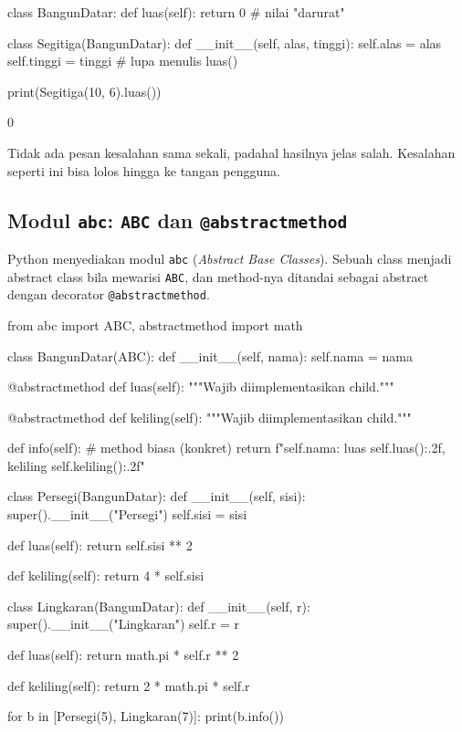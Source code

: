 \begin{kode}
class BangunDatar:
    def luas(self):
        return 0                      # nilai "darurat"

class Segitiga(BangunDatar):
    def __init__(self, alas, tinggi):
        self.alas = alas
        self.tinggi = tinggi
    # lupa menulis luas()

print(Segitiga(10, 6).luas())
\end{kode}

\begin{keluaran}
0
\end{keluaran}

Tidak ada pesan kesalahan sama sekali, padahal hasilnya jelas salah. Kesalahan seperti ini bisa lolos hingga ke tangan pengguna.

\subsection{Modul \texttt{abc}: \texttt{ABC} dan \texttt{@abstractmethod}}

Python menyediakan modul \texttt{abc} (\emph{Abstract Base Classes}). Sebuah class menjadi abstract class bila mewarisi \texttt{ABC}, dan method-nya ditandai sebagai abstract dengan decorator \texttt{@abstractmethod}.

\begin{kode}
from abc import ABC, abstractmethod
import math

class BangunDatar(ABC):
    def __init__(self, nama):
        self.nama = nama

    @abstractmethod
    def luas(self):
        """Wajib diimplementasikan child."""

    @abstractmethod
    def keliling(self):
        """Wajib diimplementasikan child."""

    def info(self):                       # method biasa (konkret)
        return f"{self.nama}: luas {self.luas():.2f}, keliling {self.keliling():.2f}"

class Persegi(BangunDatar):
    def __init__(self, sisi):
        super().__init__("Persegi")
        self.sisi = sisi

    def luas(self):
        return self.sisi ** 2

    def keliling(self):
        return 4 * self.sisi

class Lingkaran(BangunDatar):
    def __init__(self, r):
        super().__init__("Lingkaran")
        self.r = r

    def luas(self):
        return math.pi * self.r ** 2

    def keliling(self):
        return 2 * math.pi * self.r

for b in [Persegi(5), Lingkaran(7)]:
    print(b.info())
\end{kode}

